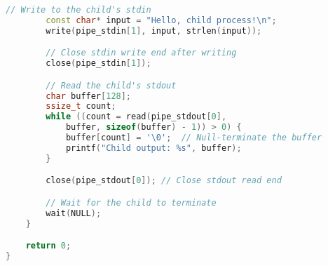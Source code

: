 \begin{lstlisting}[language=cpp]
        // Write to the child's stdin
        const char* input = "Hello, child process!\n";
        write(pipe_stdin[1], input, strlen(input));

        // Close stdin write end after writing
        close(pipe_stdin[1]);

        // Read the child's stdout
        char buffer[128];
        ssize_t count;
        while ((count = read(pipe_stdout[0],
            buffer, sizeof(buffer) - 1)) > 0) {
            buffer[count] = '\0';  // Null-terminate the buffer
            printf("Child output: %s", buffer);
        }

        close(pipe_stdout[0]); // Close stdout read end

        // Wait for the child to terminate
        wait(NULL);
    }

    return 0;
}
\end{lstlisting}
